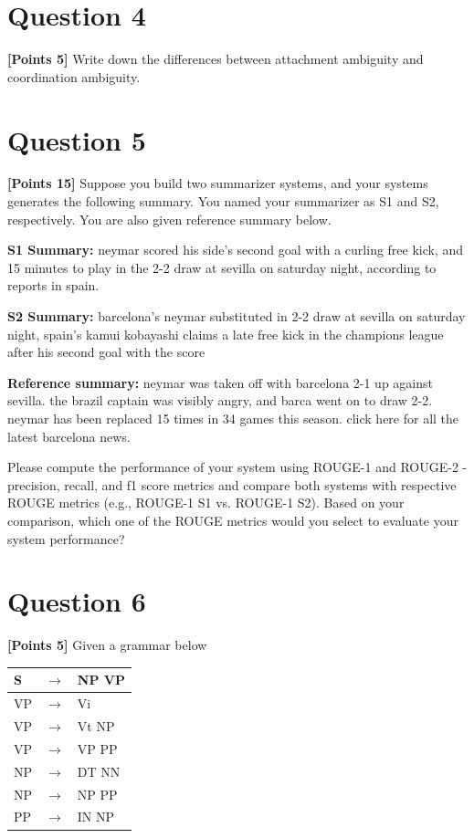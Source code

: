 \documentclass[12pt]{article}
\begin{document}
\newpage
\section*{Question 4}
\textbf{[Points 5]} Write down the differences between attachment
ambiguity and coordination ambiguity.

\newpage
\section*{Question 5}
\textbf{[Points 15]} Suppose you build two summarizer systems, and
your systems generates the following summary. You named your summarizer as
S1 and S2, respectively. You are also given reference summary below.

\textbf{S1 Summary:} neymar scored his side's second goal with a
curling free kick, and 15 minutes to play in the 2-2 draw at sevilla
on saturday night, according to reports in spain.

\textbf{S2 Summary:} barcelona's neymar substituted in 2-2 draw at
sevilla on saturday night, spain's kamui kobayashi claims a late free
kick in the champions league after his second goal with the score

\textbf{Reference summary:} neymar was taken off with barcelona 2-1 up against sevilla. the brazil
captain was visibly angry, and barca went on to draw 2-2. neymar has been replaced 15 times in
34 games this season. click here for all the latest barcelona news.

Please compute the performance of your system using ROUGE-1 and ROUGE-2 - precision,
recall, and f1 score metrics and compare both systems with respective ROUGE metrics (e.g.,
ROUGE-1 S1 vs. ROUGE-1 S2). Based on your comparison, which one of the ROUGE metrics
would you select to evaluate your system performance?

\newpage
\section*{Question 6}
\textbf{[Points 5]} Given a grammar below

\begin{tabular}{|lll|}
      \hline
      S  & $\rightarrow$ & NP VP \\
      \hline
      VP & $\rightarrow$ & Vi    \\
      VP & $\rightarrow$ & Vt NP \\
      VP & $\rightarrow$ & VP PP \\
      \hline
      NP & $\rightarrow$ & DT NN \\
      NP & $\rightarrow$ & NP PP \\
      \hline
      PP & $\rightarrow$ & IN NP \\
      \hline
\end{tabular}
\end{document}
